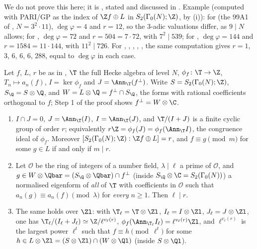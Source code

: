 We do not prove this here; it is \cite[Theorem 2.2]{ARS12}, stated and discussed in . Example (computed with PARI/GP as the index
of $\Z f\oplus L$ in $S_2(\Gamma_0(N);\Z)$, by (i)): for  (the 99A1 of \cite{ARS12}, $N=3^2\cdot11$), $\deg\varphi=4$ and $r=12$, so the
$3$-adic valuations differ, as $9\mid N$ allows; for , $\deg\varphi=72$ and $r=504=7\cdot72$, with $7^2\mid539$; for , $\deg\varphi=144$ and $r=1584=11\cdot144$, with $11^2\mid726$. For , , ,
, ,  the same computation gives $r=1$, $3$, $6$, $6$, $6$, $288$, equal to $\deg\varphi$ in each case.

\begin{lemma}\label{lem:modgalrep:crit}
Let $f$, $L$, $r$ be as in , $\T$ the full Hecke algebra of level $N$, $\phi_f\colon\T\to\Z$, $T_n\mapsto a_n(f)$, $I=\ker\phi_f$ and
$J=\Ann_\T(f^\perp)$. Write $S=S_2(\Gamma_0(N);\Z)$, $S_\Q=S\otimes\Q$, and $W=L\otimes\Q=f^\perp\cap S_\Q$, the forms with rational coefficients orthogonal to $f$; Step 1
of the proof shows $f^\perp=W\otimes\C$.
\begin{enumerate}[label=(\roman*)]
\item $I\cap J=0$, $J=\Ann_\T(I)$, $I=\Ann_\T(J)$, and $\T/(I+J)$ is a finite cyclic group of order $r$; equivalently $r\Z=\phi_f(J)=\phi_f(\Ann_\T I)$, the congruence ideal of $\phi_f$.
Moreover $[S_2(\Gamma_0(N);\Z):\Z f\oplus L]=r$, and $f\equiv g\pmod m$ for some $g\in L$ if and only if $m\mid r$.
\item Let $\mathcal{O}$ be the ring of integers of a number field, $\lambda\mid\ell$ a prime of $\mathcal{O}$, and $g\in W\otimes\Qbar=(S_\Q\otimes\Qbar)\cap f^\perp$ (inside $S_\Q\otimes\C=S_2(\Gamma_0(N))$) a normalised eigenform of \emph{all} of $\T$
with coefficients in $\mathcal{O}$ such that $a_n(g)\equiv a_n(f)\pmod\lambda$ for \emph{every} $n\ge1$. Then $\ell\mid r$.
\item The same holds over $\Zl$: with $\T_\ell=\T\otimes\Zl$, $I_\ell=I\otimes\Zl$, $J_\ell=J\otimes\Zl$, one has $\T_\ell/(I_\ell+J_\ell)\simeq\Z/\ell^{v_\ell(r)}$, $\phi_f(\Ann_{\T_\ell}I_\ell)=\ell^{v_\ell(r)}\Zl$,
and $\ell^{v_\ell(r)}$ is the largest power $\ell^t$ such that $f\equiv h\pmod{\ell^t}$ for some $h\in L\otimes\Zl=(S\otimes\Zl)\cap(W\otimes\Ql)$ (inside $S\otimes\Ql$).
\end{enumerate}
\end{lemma}

